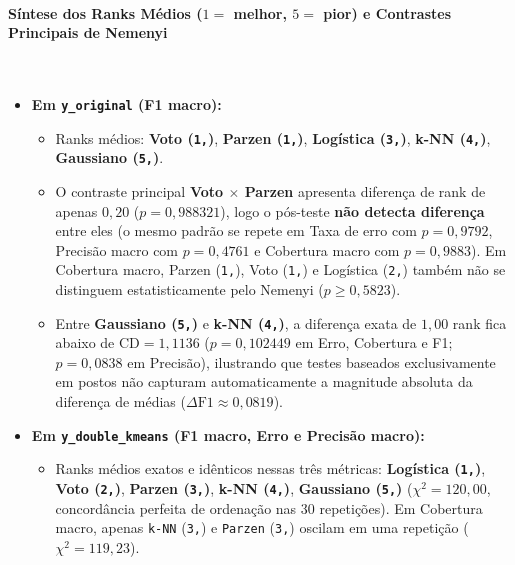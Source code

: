 \documentclass[a4paper,11pt]{article}
\begin{document}
\paragraph{\texorpdfstring{Síntese dos Ranks Médios ($1 =$ melhor, $5 =$ pior) e Contrastes Principais de Nemenyi}{Síntese dos Ranks Médios (1 = melhor, 5 = pior) e Contrastes Principais de Nemenyi}}\mbox{}\\[-0.2em]\label{sec:sintese-dos-ranks-medios-1-melhor-5-pior-e-contrastes-principais-de-nemenyi}


\begin{itemize}[leftmargin=1.5em, itemsep=0.25em, topsep=0.25em]
  \item \textbf{Em \texttt{y\_\allowbreak original} (F1 macro):}
\begin{itemize}[leftmargin=1.5em, itemsep=0.25em, topsep=0.25em]
  \item Ranks médios: \textbf{Voto (\texttt{1,})}, \textbf{Parzen (\texttt{1,})}, \textbf{Logística (\texttt{3,})}, \textbf{k-NN (\texttt{4,})}, \textbf{Gaussiano (\texttt{5,})}.
  \item O contraste principal \textbf{Voto $\times$ Parzen} apresenta diferença de rank de apenas $0,20$ ($p = 0,988321$), logo o pós-teste \textbf{não detecta diferença} entre eles (o mesmo padrão se repete em Taxa de erro com $p = 0,9792$, Precisão macro com $p = 0,4761$ e Cobertura macro com $p = 0,9883$). Em Cobertura macro, Parzen (\texttt{1,}), Voto (\texttt{1,}) e Logística (\texttt{2,}) também não se distinguem estatisticamente pelo Nemenyi ($p \ge 0,5823$).
  \item Entre \textbf{Gaussiano (\texttt{5,})} e \textbf{k-NN (\texttt{4,})}, a diferença exata de $1,00$ rank fica abaixo de $\text{CD} = 1,1136$ ($p = 0,102449$ em Erro, Cobertura e F1; $p = 0,0838$ em Precisão), ilustrando que testes baseados exclusivamente em postos não capturam automaticamente a magnitude absoluta da diferença de médias ($\Delta \text{F1} \approx 0,0819$).
\end{itemize}
  \item \textbf{Em \texttt{y\_\allowbreak double\_\allowbreak kmeans} (F1 macro, Erro e Precisão macro):}
\begin{itemize}[leftmargin=1.5em, itemsep=0.25em, topsep=0.25em]
  \item Ranks médios exatos e idênticos nessas três métricas: \textbf{Logística (\texttt{1,})}, \textbf{Voto (\texttt{2,})}, \textbf{Parzen (\texttt{3,})}, \textbf{k-NN (\texttt{4,})}, \textbf{Gaussiano (\texttt{5,})} ($\chi^2 = 120,00$, concordância perfeita de ordenação nas $30$ repetições). Em Cobertura macro, apenas \texttt{k-NN} (\texttt{3,}) e \texttt{Parzen} (\texttt{3,}) oscilam em uma repetição ($\chi^2 = 119,23$).

\end{itemize}
\end{itemize}
\end{document}
